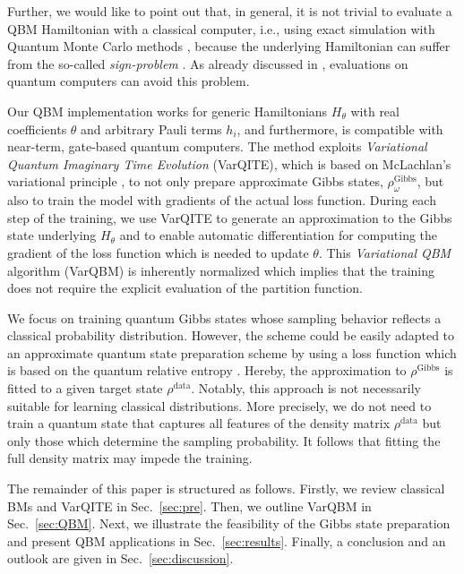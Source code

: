 \documentclass[twocolumn, aps, pra, superscriptaddress, floatfix]{revtex4}
\newcommand{\varqbm}{VarQBM}
\begin{document}
Further, we would like to point out that, in general, it is not trivial to evaluate a QBM Hamiltonian with a classical computer, i.e., using exact simulation with Quantum Monte Carlo methods \cite{Troyer05}, because the underlying Hamiltonian can suffer from the so-called \emph{sign-problem} \cite{Hangleiter2019EasingTM, OkunishiSignProblem14, Li2016SignProblemFreeQMC, SignProblemAlet16, PhysRevB.91.241117}. As already discussed in \cite{OrtizQAFermionic01}, evaluations on quantum computers can avoid this problem.

Our QBM implementation works for generic Hamiltonians $H_{\theta}$ with real coefficients $\theta$ and arbitrary Pauli terms $h_i$, and furthermore, is compatible with near-term, gate-based quantum computers.
The method exploits \emph{Variational Quantum Imaginary Time Evolution} \cite{VarSITEMcArdle19, Simon18TheoryVarQSim} (VarQITE), which is based on McLachlan's variational principle \cite{McLachlan64}, to not only prepare approximate Gibbs states, $\rho_{\omega}^{\text{Gibbs}}$, but also to train the model with gradients of the actual loss function.
During each step of the training, we use VarQITE to generate an approximation to the Gibbs state underlying $H_{\theta}$ and to enable automatic differentiation for computing the gradient of the loss function which is needed to update $\theta$.
This \emph{Variational QBM} algorithm (\varqbm) is inherently normalized which implies that the training does not require the explicit evaluation of the partition function. 

We focus on training quantum Gibbs states whose sampling behavior reflects a classical probability distribution. However, the scheme could be easily adapted to an approximate quantum state preparation scheme by using a loss function which is based on the quantum relative entropy \cite{QBMWiebe17, Kappen18QBM, Wiebe2019GenerativeTO}.
Hereby, the approximation to $\rho^{\text{Gibbs}}$ is fitted to a given target state $\rho^{\text{data}}$. 
Notably, this approach is not necessarily suitable for learning classical distributions. More precisely, we do not need to train a quantum state that captures all features of the density matrix $\rho^{\text{data}}$ but only those which determine the sampling probability. 
It follows that fitting the full density matrix may impede the training.

The remainder of this paper is structured as follows. Firstly, we review classical BMs and VarQITE in Sec.~\ref{sec:pre}.
Then, we outline \varqbm{} in Sec.~\ref{sec:QBM}. Next, we illustrate the feasibility of the Gibbs state preparation and present QBM applications in Sec.~\ref{sec:results}.
Finally, a conclusion and an outlook are given in Sec.~\ref{sec:discussion}.
\end{document}
